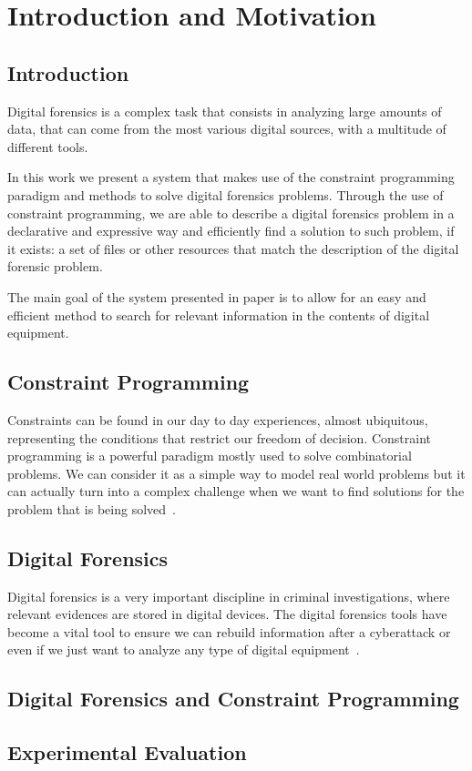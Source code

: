 \chapter{Introduction and Motivation}

\section{Introduction}

Digital forensics is a complex task that consists in analyzing large amounts of data, that can come from the most various digital sources, with a multitude of different tools.

In this work we present a system that makes use of the constraint programming paradigm and methods to solve digital forensics problems. Through the use of constraint programming, we are able to describe a digital forensics problem in a declarative and expressive way and efficiently find a solution to such problem, if it exists: a set of files or other resources that match the description of the digital forensic problem.

The main goal of the system presented in paper is to allow for an easy and efficient method to search for relevant information in the contents of digital equipment.

\section{Constraint Programming}

Constraints can be found in our day to day experiences, almost ubiquitous, representing the conditions that restrict our freedom of decision. Constraint programming is a powerful paradigm mostly used to solve combinatorial problems. We can consider it as a simple way to model real world problems but it can actually turn into a complex challenge when we want to find solutions for the problem that is being solved~\cite{Rossi2006}. 

\section{Digital Forensics}

Digital forensics is a very important discipline in criminal investigations, where relevant evidences are stored in digital devices. The digital forensics tools have become a vital tool to ensure we can rebuild information after a cyberattack or even if we just want to analyze any type of digital equipment~\cite{Garfinkel2010}.

\section{Digital Forensics and Constraint Programming}

\section{Experimental Evaluation}